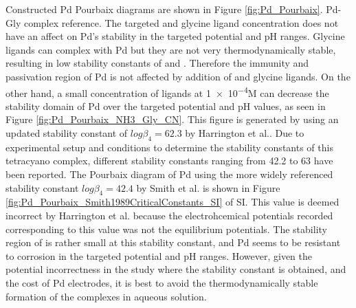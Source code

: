 \documentclass[journal=jacsat,manuscript=article]{achemso}
\begin{document}
Constructed Pd Pourbaix diagrams are shown in Figure \ref{fig:Pd_Pourbaix}. Pd-Gly complex reference. The targeted \ce[NH3] and glycine ligand concentration does not have an affect on Pd's stability in the targeted potential and pH ranges. Glycine ligands can complex with Pd but they are not very thermodynamically stable, resulting in low stability constants of \ce{[Pd(Gly)^+]} and \ce{[Pd(Gly)2]}. Therefore the immunity and passivation region of Pd is not affected by addition of  and glycine ligands. On the other hand, a small concentration of  ligands at \num{1e-4}M can decrease the stability domain of Pd over the targeted potential and pH values, as seen in Figure \ref{fig:Pd_Pourbaix_NH3_Gly_CN}. This figure is generated by using an updated stability constant of \ce{[Pd(CN)4^2+]} $log\beta_4=62.3$ by Harrington et al.\cite{Harrington2005DeterminationIon}. Due to experimental setup and conditions to determine the stability constants of this tetracyano complex, different stability constants ranging from 42.2\cite{Smith1989CriticalConstants} to 63\cite{Cabbiness1969MacrocyclicComplexes} have been reported. The Pourbaix diagram of Pd using the more widely referenced stability constant $log\beta_4=42.4$ by Smith et al.\cite{Smith1989CriticalConstants} is shown in Figure 
\ref{fig:Pd_Pourbaix_Smith1989CriticalConstants_SI} of SI. This value is deemed incorrect by Harrington et al. because the electrohcemical potentials recorded corresponding to this value was not the equilibrium potentials. The stability region of \ce{[Pd(CN)4^2+]} is rather small at this stability constant, and Pd seems to be resistant to corrosion in the targeted potential and pH ranges. However, given the potential incorrectness in the study where the stability constant is obtained, and the cost of Pd electrodes, it is best to avoid the thermodynamically stable formation of the \ce{[Pd(CN)4^2+]} complexes in aqueous solution.
\end{document}
